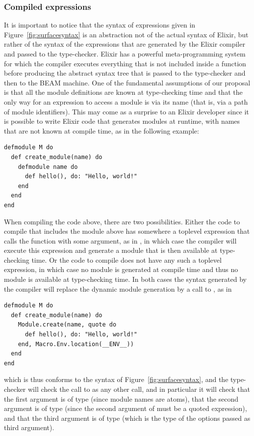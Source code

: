 \documentclass[a4paper,10pt]{article}
\begin{document}
\subsubsection{Compiled expressions}
It is important to notice that the syntax of expressions given in Figure~\ref{fig:surfacesyntax} is an abstraction not of the actual syntax of Elixir, but rather of the syntax of the expressions that are generated by the Elixir compiler and passed to the type-checker. Elixir has a powerful meta-programming system for which the compiler executes everything that is not included inside a function before producing the abstract syntax tree that is passed to the type-checker and then to the BEAM machine. One of the fundamental assumptions of our proposal is that all the module definitions are known at type-checking time and that the only way for an expression to access a module is via its name (that is, via a path of module identifiers). This may come as a surprise to an Elixir developer since it is possible to write Elixir code that generates modules at runtime, with names that are not known at compile time, as in the following example:
\begin{verbatim}
defmodule M do
  def create_module(name) do
    defmodule name do
      def hello(), do: "Hello, world!"
    end
  end
end
\end{verbatim}
When compiling the code above, there are two possibilities. Either the code to compile that includes the module above has somewhere a toplevel expression that calls the function  with some argument, as in , in which case the compiler will execute this expression and generate a module  that is then available at type-checking time. Or the code to compile does not have any such a toplevel expression, in which case no module is generated at compile time and thus no module is available at type-checking time. In both cases the  syntax generated by the compiler will replace the dynamic module generation by a call to , as in 
\begin{verbatim}
defmodule M do
  def create_module(name) do
    Module.create(name, quote do
      def hello(), do: "Hello, world!"
    end, Macro.Env.location(__ENV__))
  end
end
\end{verbatim}
which is thus conforms to the syntax of Figure~\ref{fig:surfacesyntax}, and the type-checker will check the call to  as any other call, and in particular it will check that the first argument is of type  (since module names are atoms), that the second argument is of type  (since the second argument of  must be a quoted expression), and that the third argument is of type  (which is the type of the options passed as third argument).
\end{document}

